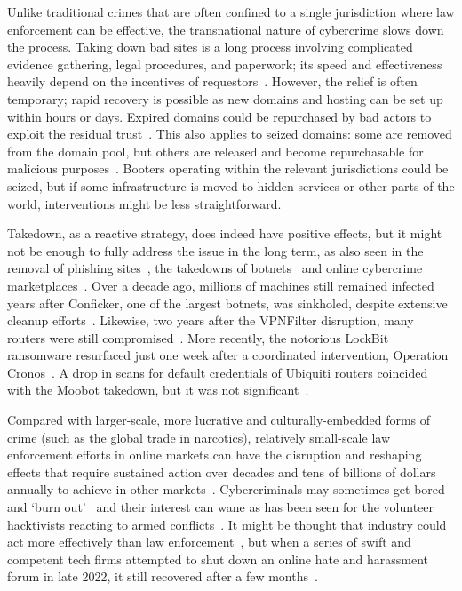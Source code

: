 \documentclass[letterpaper,twocolumn,10pt]{article}
\begin{document}
 Unlike traditional crimes that are often confined to a single jurisdiction where law enforcement can be effective, the transnational nature of cybercrime slows down the process. Taking down bad sites is a long process involving complicated evidence gathering, legal procedures, and paperwork; its speed and effectiveness heavily depend on the incentives of requestors~\cite{moore2008impact}. However, the relief is often temporary; rapid recovery is possible as new domains and hosting can be set up within hours or days. Expired domains could be repurchased by bad actors to exploit the residual trust~\cite{moore2014ghosts,lever2016domain}. This also applies to seized domains: some are removed from the domain pool, but others are released and become repurchasable for malicious purposes~\cite{alowaisheq2019cracking}. Booters operating within the relevant jurisdictions could be seized, but if some infrastructure is moved to hidden services or other parts of the world, interventions might be less straightforward. 

Takedown, as a reactive strategy, does indeed have positive effects, but it might not be enough to fully address the issue in the long term, as also seen in the removal of phishing sites~\cite{moore2007examining}, the takedowns of botnets~\cite{nadji2013beheading,nadji2015still} and online cybercrime marketplaces~\cite{soska2015measuring}. Over a decade ago, millions of machines still remained infected years after Conficker, one of the largest botnets, was sinkholed, despite extensive cleanup efforts~\cite{asghari2015post}. Likewise, two years after the VPNFilter disruption, many routers were still compromised~\cite{vpnfiltertakedown}. More recently, the notorious LockBit ransomware resurfaced just one week after a coordinated intervention, Operation Cronos~\cite{lockbitresurface}. A drop in scans for default credentials of Ubiquiti routers coincided with the Moobot takedown, but it was not significant~\cite{moobottakedown}. 

Compared with larger-scale, more lucrative and culturally-embedded forms of crime (such as the global trade in narcotics), relatively small-scale law enforcement efforts in online markets can have the disruption and reshaping effects that require sustained action over decades and tens of billions of dollars annually to achieve in other markets~\cite{golz2018market}. Cybercriminals may sometimes get bored and `burn out'~\cite{collier2020cybercrime} and their interest can wane as has been seen for the volunteer hacktivists reacting to armed conflicts~\cite{vu2024getting,vu2023defacement}. It might be thought that industry could act more effectively than law enforcement~\cite{hutchings2016taking}, but when a series of swift and competent tech firms attempted to shut down an online hate and harassment forum in late 2022, it still recovered after a few months~\cite{vu2024no}. 
\end{document}
